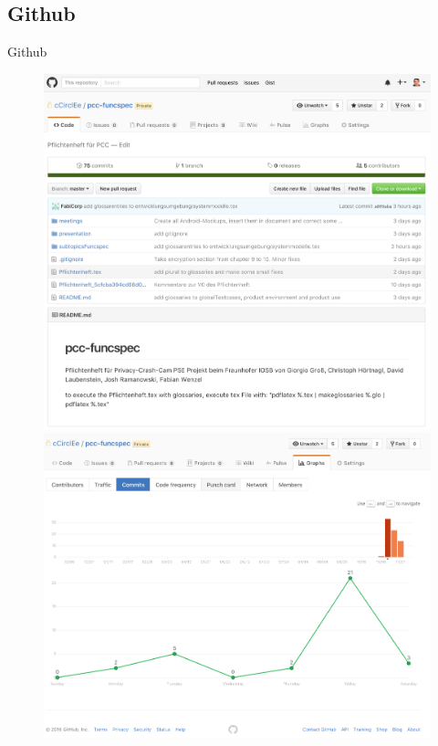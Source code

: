 \documentclass[19pt]{beamer}
\begin{document}
\subsection{Github}
\begin{frame}[allowframebreaks]{Github}
	\begin{figure}
		\begin{center}
			\includegraphics[scale=0.20]{logos/Github} 
		\end{center}
		\framebreak
		\begin{center}
			\includegraphics[scale=0.23]{logos/GithubStats} 
		\end{center}
	\end{figure}				
\end{frame}
\end{document}
